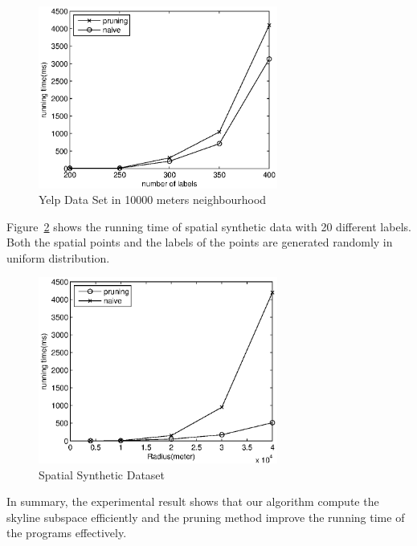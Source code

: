 \begin{figure}[h]
    \centering
      \includegraphics[width=0.7\textwidth]{figs/Yelp10Kmeters}
    \caption{Yelp Data Set in 10000 meters neighbourhood}
    \label{fig:exp:yelp10k}
\end{figure}

Figure~\ref{fig:exp:spatial} shows the running time of spatial synthetic data with 20 different labels. Both the spatial points and the labels of the points are generated randomly in uniform distribution.

\begin{figure}[h]
    \centering
        \includegraphics[width=0.7\textwidth]{figs/Spatial}
    \caption{Spatial Synthetic Dataset}
    \label{fig:exp:spatial}
\end{figure}

In summary, the experimental result shows that our algorithm compute the skyline subspace efficiently and the pruning method improve the running time of the programs effectively.
